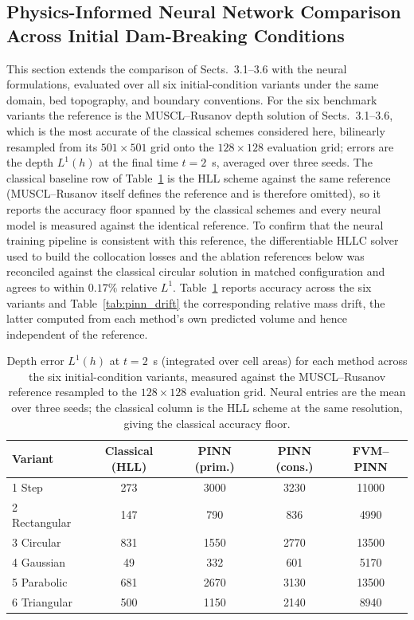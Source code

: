 \documentclass[12pt]{article}
\newenvironment{newtext}{\par\color{red}}{\par}
\begin{document}
\begin{newtext}
\subsection{Physics-Informed Neural Network Comparison Across Initial Dam-Breaking Conditions}

This section extends the comparison of Sects.~3.1--3.6 with the neural formulations, evaluated over all six initial-condition variants under the same domain, bed topography, and boundary conventions. For the six benchmark variants the reference is the MUSCL--Rusanov depth solution of Sects.~3.1--3.6, which is the most accurate of the classical schemes considered here, bilinearly resampled from its $501\times501$ grid onto the $128\times128$ evaluation grid; errors are the depth $L^1(h)$ at the final time $t=2$~s, averaged over three seeds. The classical baseline row of Table~\ref{tab:pinn_main} is the HLL scheme against the same reference (MUSCL--Rusanov itself defines the reference and is therefore omitted), so it reports the accuracy floor spanned by the classical schemes and every neural model is measured against the identical reference. To confirm that the neural training pipeline is consistent with this reference, the differentiable HLLC solver used to build the collocation losses and the ablation references below was reconciled against the classical circular solution in matched configuration and agrees to within $0.17\%$ relative $L^1$. Table~\ref{tab:pinn_main} reports accuracy across the six variants and Table~\ref{tab:pinn_drift} the corresponding relative mass drift, the latter computed from each method's own predicted volume and hence independent of the reference.

\begin{table}[h!]
\centering
\caption{Depth error $L^1(h)$ at $t=2$~s (integrated over cell areas) for each method across the six initial-condition variants, measured against the MUSCL--Rusanov reference resampled to the $128\times128$ evaluation grid. Neural entries are the mean over three seeds; the classical column is the HLL scheme at the same resolution, giving the classical accuracy floor.}
\label{tab:pinn_main}
\begin{tabular}{lcccc}
\hline
\textbf{Variant} & Classical (HLL) & PINN (prim.) & PINN (cons.) & FVM--PINN \\
\hline
1 Step & 273 & 3000 & 3230 & 11000 \\
2 Rectangular & 147 & 790 & 836 & 4990 \\
3 Circular & 831 & 1550 & 2770 & 13500 \\
4 Gaussian & 49 & 332 & 601 & 5170 \\
5 Parabolic & 681 & 2670 & 3130 & 13500 \\
6 Triangular & 500 & 1150 & 2140 & 8940 \\
\hline
\end{tabular}
\end{table}


\end{newtext}
\end{document}
